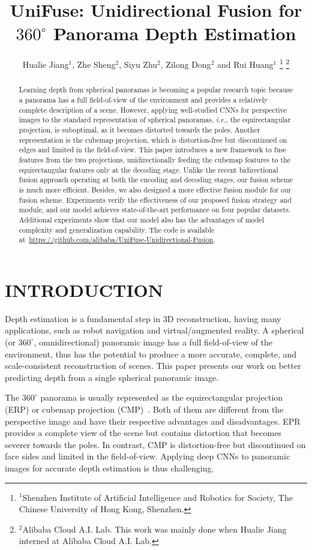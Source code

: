 \documentclass[letterpaper, 10 pt, conference]{ieeeconf}
\title{\LARGE \bf
UniFuse: Unidirectional Fusion for \boldmath$360^{\circ}$ Panorama Depth Estimation}
\author{Hualie Jiang$^{1}$, Zhe Sheng$^{2}$, Siyu Zhu$^{2}$, Zilong Dong$^{2}$ and Rui Huang$^{1}$ 
\thanks{$^{1}$Shenzhen Institute of Artificial Intelligence and Robotics for Society, The Chinese University of Hong Kong, Shenzhen.}
\thanks{$^{2}$Alibaba Cloud A.I. Lab. This work was mainly done when Hualie Jiang interned at Alibaba Cloud A.I. Lab.}
}
\def\ie{\emph{i.e.}}
\begin{document}
\maketitle
\thispagestyle{empty}
\pagestyle{empty}


\begin{abstract}
Learning depth from spherical panoramas is becoming a popular research topic because a panorama has a full field-of-view of the environment and provides a relatively complete description of a scene. However, applying well-studied CNNs for perspective images to the standard representation of spherical panoramas, \ie, the equirectangular projection, is suboptimal, as it becomes distorted towards the poles. Another representation is the cubemap projection, which is distortion-free but discontinued on edges and limited in the field-of-view. This paper introduces a new framework to fuse features from the two projections, unidirectionally feeding the cubemap features to the equirectangular features only at the decoding stage. Unlike the recent bidirectional fusion approach operating at both the encoding and decoding stages, our fusion scheme is much more efficient. Besides, we also designed a more effective fusion module for our fusion scheme. Experiments verify the effectiveness of our proposed fusion strategy and module, and our model achieves state-of-the-art performance on four popular datasets. Additional experiments show that our model also has the advantages of model complexity and generalization capability. The code is available at~\url{https://github.com/alibaba/UniFuse-Unidirectional-Fusion}. 
\end{abstract}




\section{INTRODUCTION}

Depth estimation is a fundamental step in 3D reconstruction, having many applications, such as robot navigation and virtual/augmented reality.  
A spherical (or $360^{\circ}$, omnidirectional) panoramic image has a full field-of-view of the environment, thus has the potential to produce a more accurate, complete, and scale-consistent reconstruction of scenes.
This paper presents our work on better predicting depth from a single spherical panoramic image. 

The $360^{\circ}$ panorama is usually represented as the equirectangular projection (ERP) or cubemap projection (CMP)~\cite{skupin2017standardization}. Both of them are different from the perspective image and have their respective advantages and disadvantages. 
EPR provides a complete view of the scene but contains distortion that becomes severer towards the poles. In contrast, CMP is distortion-free but discontinued on face sides and limited in the field-of-view.
Applying deep CNNs to panoramic images for accurate depth estimation is thus challenging. 
\end{document}
